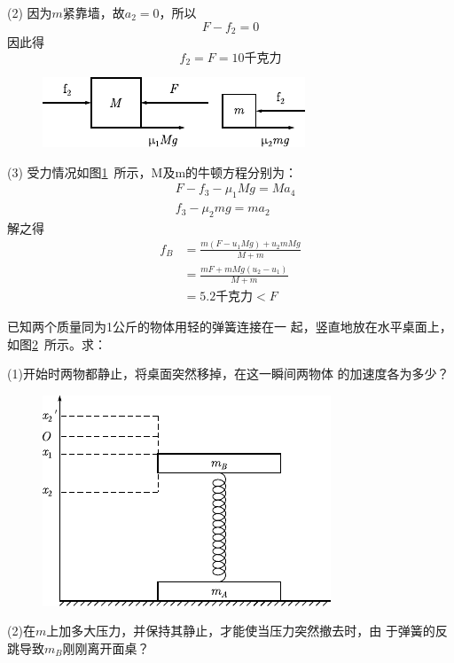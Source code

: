 (2) 因为$ m $紧靠墙，故$ a _ { 2 } = 0 $，所以
\begin{equation*}
 F - f _ { 2 } = 0
\end{equation*}
因此得
\begin{equation*}
 f _ { 2 } = F = 1 0 \text{千克力}
\end{equation*}

\begin{figure}
    \centering
    \includegraphics{figure/fig03.10}
    \caption{}
    \label{fig:03.10}
\end{figure}
(3) 受力情况如图\ref{fig:03.10}~所示，M及m的牛顿方程分别为：
{\setlength{\mathindent}{2em}
\begin{align*}
 &F - f _ { 3 } - \mu _ { 1 } M g = M a _ { 4 } \\
 &f _ { 3 } - \mu _ { 2 } m g = m a _ { 2 }
\end{align*}}
解之得
\begin{align*}
 f _ { B } &= \frac { m ( F - u _ { 1 } M g ) + u _ { 2 } m M g } { M + m } \\
  &= \frac { m F + m M g ( u _ { 2 } - u _ { 1 } ) } { M + m } \\
  &= 5 . 2 \text{千克力}<F
\end{align*}

\example 已知两个质量同为1公斤的物体用轻的弹簧连接在一
起，竖直地放在水平桌面上，如图\ref{fig:03.11}~所示。求：

(1)开始时两物都静止，将桌面突然移掉，在这一瞬间两物体
的加速度各为多少？

\begin{figure}
    \centering
    \includegraphics{figure/fig03.11}
    \caption{}
    \label{fig:03.11}
\end{figure}
(2)在$ m $上加多大压力，并保持其静止，才能使当压力突然撤去时，由
于弹簧的反跳导致$ m_B $刚刚离开面桌？

